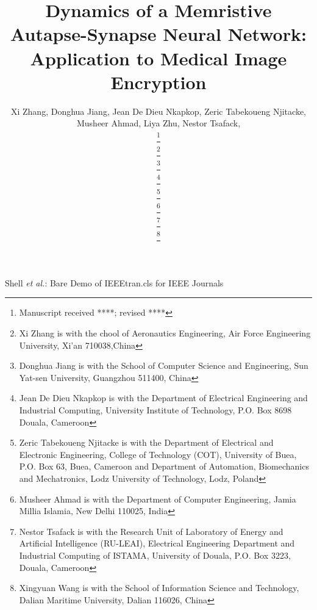 \documentclass[journal]{IEEEtran/IEEEtran}
\begin{document}
\title{Dynamics of a Memristive Autapse-Synapse Neural Network: Application to Medical Image Encryption}

\author{Xi Zhang, Donghua Jiang,  Jean De Dieu Nkapkop, Zeric Tabekoueng Njitacke, Musheer Ahmad,  Liya Zhu, Nestor Tsafack,

\thanks{Manuscript received ****; revised ****}

\thanks{Xi Zhang is with the chool of Aeronautics Engineering, Air Force Engineering University, Xi'an 710038,China}

\thanks{Donghua Jiang is with the School of Computer Science and Engineering, Sun Yat-sen University, Guangzhou 511400, China}

\thanks{Jean De Dieu Nkapkop is with the Department of Electrical Engineering and Industrial Computing, University Institute of Technology, P.O. Box 8698 Douala, Cameroon}

\thanks{Zeric Tabekoueng Njitacke is with the Department of Electrical and Electronic Engineering, College of Technology (COT), University of Buea, P.O. Box 63, Buea, Cameroon and Department of Automation, Biomechanics and Mechatronics, Lodz University of Technology, Lodz, Poland}

\thanks{Musheer Ahmad is with the Department of Computer Engineering, Jamia Millia Islamia, New Delhi 110025, India}

\thanks{Nestor Tsafack is with the Research Unit of Laboratory of Energy and Artificial Intelligence (RU-LEAI), Electrical Engineering Department and Industrial Computing of ISTAMA, University of Douala, P.O. Box 3223, Douala, Cameroon}

\thanks{Xingyuan Wang is with the School of Information Science and Technology, Dalian Maritime University, Dalian 116026, China}
}
{Shell \MakeLowercase{\textit{et al.}}: Bare Demo of IEEEtran.cls for IEEE Journals}


\maketitle
\end{document}
